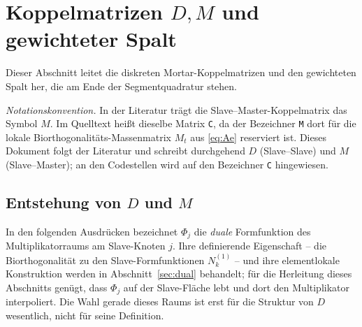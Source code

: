 \documentclass[a4paper,11pt]{article}
\def\bm#1{#1}%
\newcommand{\code}[1]{\texttt{\small #1}}
\let\stdsection\section
\renewcommand{\section}{\clearpage\stdsection}
\begin{document}
\section{Koppelmatrizen $\bm D,\bm M$ und gewichteter Spalt}
\label{sec:koppelmatrizen}

Dieser Abschnitt leitet die diskreten Mortar-Koppelmatrizen und den gewichteten Spalt her, die am
Ende der Segmentquadratur stehen.

\medskip
\noindent\emph{Notationskonvention.} In der Literatur trägt die Slave--Master-Koppelmatrix das
Symbol $\bm M$. Im Quelltext heißt dieselbe Matrix \code{C}, da der Bezeichner \code{M} dort für die
lokale Biorthogonalitäts-Massenmatrix $\bm M_t$ aus \eqref{eq:Ae} reserviert ist. Dieses Dokument
folgt der Literatur und schreibt durchgehend $\bm D$ (Slave--Slave) und $\bm M$ (Slave--Master); an
den Codestellen wird auf den Bezeichner \code{C} hingewiesen.

\subsection{Entstehung von $\bm D$ und $\bm M$}
In den folgenden Ausdrücken bezeichnet $\Phi_j$ die \emph{duale} Formfunktion des
Multiplikatorraums am Slave-Knoten $j$. Ihre definierende Eigenschaft -- die Biorthogonalität zu
den Slave-Formfunktionen $N_k^{(1)}$ -- und ihre elementlokale Konstruktion werden in
Abschnitt~\ref{sec:dual} behandelt; für die Herleitung dieses Abschnitts genügt, dass $\Phi_j$ auf
der Slave-Fläche lebt und dort den Multiplikator interpoliert. Die Wahl gerade dieses Raums ist
erst für die Struktur von $\bm D$ wesentlich, nicht für seine Definition.
\end{document}
